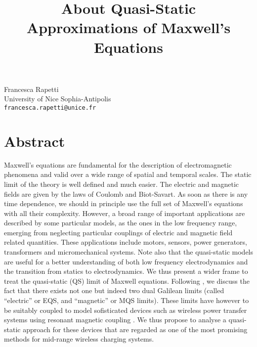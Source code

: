 \title{About Quasi-Static Approximations of Maxwell's Equations}
 \author{} \institute{}
\maketitle
\begin{center}
{\large Francesca Rapetti}\\
University of Nice Sophia-Antipolis\\
{\tt francesca.rapetti@unice.fr}
\end{center}

\section*{Abstract}

Maxwell's equations are fundamental for the description
of electromagnetic phenomena and valid over a wide range 
of spatial and temporal scales. The static limit
of the theory is well defined and much easier.
The electric and magnetic fields are given by the laws
of Coulomb and Biot-Savart.
As soon as there is any time dependence, we should in principle
use the full set of Maxwell's equations with all their complexity.
However, a broad range of important applications are described by
some particular models, as the ones in the low frequency range, emerging from neglecting
particular couplings of electric and magnetic field related quantities. 
These applications include motors, sensors, power generators, transformers and
micromechanical systems.
Note also that the quasi-static models are useful for a better 
understanding of both low frequency electrodynamics and 
the transition from statics to electrodynamics.
We thus present a wider frame to treat 
the quasi-static (QS) limit of Maxwell equations. Following \cite{LL,Melcher,GM}, 
we discuss the fact
that there exists not one but indeed two dual Galilean limits (called ``electric'' or EQS, and ``magnetic'' or MQS limits).   
These limits have however to be suitably coupled to model sofisticated devices such as 
wireless power transfer systems using resonant magnetic coupling \cite{Ka}. We thus propose
to analyse a quasi-static approach   for these devices that are regarded as one of the most promising methods for mid-range wireless charging systems.





